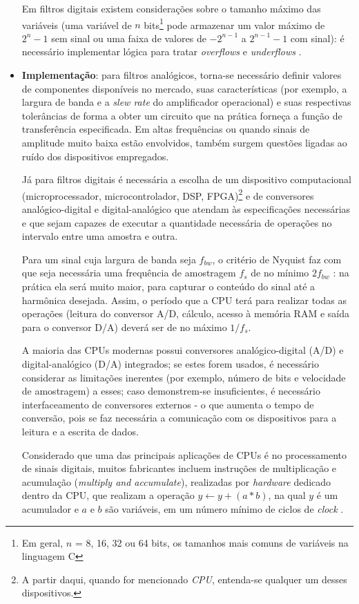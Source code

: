 \begin{itemize}
Em filtros digitais existem considerações sobre o tamanho máximo das variáveis (uma variável de $n$ bits\footnote{Em geral, $n$ = 8, 16, 32 ou 64 bits, os tamanhos mais comuns de variáveis na linguagem C} pode armazenar um valor máximo de $2^n - 1$ sem sinal ou uma faixa de valores de $-2^{n-1}$ a $2^{n-1}-1$ com sinal): é necessário implementar lógica para tratar \textit{overflows} e \textit{underflows} \cite{smith_dsp}. 

\item{\textbf{Implementação}:} para filtros analógicos, torna-se necessário definir valores de componentes disponíveis no mercado, suas características (por exemplo, a largura de banda e a \textit{slew rate} do amplificador operacional) e suas respectivas tolerâncias de forma a obter um circuito que na prática forneça a função de transferência especificada. \cite{jung} Em altas frequências ou quando sinais de amplitude muito baixa estão envolvidos, também surgem questões ligadas ao ruído dos dispositivos empregados.

Já para filtros digitais é necessária a escolha de um dispositivo computacional (microprocessador, microcontrolador, DSP, FPGA)\footnote{A partir daqui, quando for mencionado \textit{CPU}, entenda-se qualquer um desses dispositivos.} e de conversores analógico-digital e digital-analógico que atendam às especificações necessárias e que sejam capazes de executar a quantidade necessária de operações no intervalo entre uma amostra e outra.

Para um sinal cuja largura de banda seja $f_{bw}$, o critério de Nyquist faz com que seja necessária uma frequência de amostragem $f_s$ de no mínimo $2 f_{bw}$ \cite{haykin}: na prática ela será muito maior, para capturar o conteúdo do sinal até a harmônica desejada. Assim, o período que a CPU terá para realizar todas as operações (leitura do conversor A/D, cálculo, acesso à memória RAM e saída para o conversor D/A) deverá ser de no máximo $1/{f_s}$.

A maioria das CPUs modernas possui conversores analógico-digital (A/D) e digital-analógico (D/A) integrados; se estes forem usados, é necessário considerar as limitações inerentes (por exemplo, número de bits e velocidade de amostragem) a esses; caso demonstrem-se insuficientes, é necessário interfaceamento de conversores externos - o que aumenta o tempo de conversão, pois se faz necessária a comunicação com os dispositivos para a leitura e a escrita de dados.

Considerado que uma das principais aplicações de CPUs é no processamento de sinais digitais, muitos fabricantes incluem instruções de multiplicação e acumulação (\textit{multiply and accumulate}), realizadas por \textit{hardware} dedicado dentro da CPU, que realizam a operação $y \leftarrow y + (a * b)$, na qual $y$ é um acumulador e $a$ e $b$ são variáveis, em um número mínimo de ciclos de \textit{clock} \cite{dspic}. 


\end{itemize}
